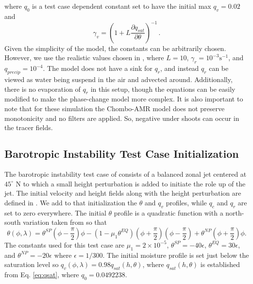    where $q_0$ is a test case dependent constant set to have the initial max $q_v=0.02$ and
   \begin{equation}
     \label{eq:gammav} \gamma_v = \left(1 + L \frac{\partial q_{sat}}{\partial \theta}\right)^{-1} \, .
   \end{equation}
Given the simplicity of the model, the constants can be arbitrarily chosen. 
However, we use the realistic values chosen in \cite{zerroukat2015moist}, 
where $L=10$, $\gamma_r = 10^{-3} \mathrm{ s}^{-1}$, and $q_{precip} = 10^{-4}$. 
The model does not have a sink for $q_r$, and instead $q_r$ can be viewed 
as water being suspend in the air and advected around. Additionally, there
is no evaporation of $q_r$ in this setup, though the equations can be 
easily modified to make the phase-change model more complex. It is also
important to note that for these simulation the Chombo-AMR model does
not preserve monotonicity and no filters are applied. So, 
negative under shoots can occur in the tracer fields.
  
\subsection{Barotropic Instability Test Case Initialization}
The barotropic instability test case of \cite{galewsky2004initial} 
consists of a balanced zonal jet centered at $45^\circ$ N to 
which a small height perturbation is added to initiate the role up
of the jet. The initial velocity and height fields along with the height
perturbation are defined in \cite{galewsky2004initial}.
We add to that initialization the
$\theta$ and $q_v$ profiles, while $q_c$ and $q_r$ are set to zero everywhere.  
The initial $\theta$ profile is a quadratic function with a north-south variation
     taken from \cite{zerroukat2015moist} so that
   \begin{equation}
     \label{eq:pottemp}
     \theta(\phi, \lambda) = \theta^{SP}\left(\phi - \frac{\pi}{2}\right)\phi - 
     \left(1 - \mu_1 \theta^{EQ}\right)\left(\phi + \frac{\pi}{2}\right)\left(\phi - \frac{\pi}{2}\right)
     + \theta^{NP}\left(\phi + \frac{\pi}{2}\right)\phi.
   \end{equation}
The constants used for this test case are $\mu_1 = 2\times 10^{-5} $, 
$\theta^{SP}= -40\epsilon$, $\theta^{EQ}= 30\epsilon$,
and $\theta^{NP}= -20\epsilon$ where $\epsilon = 1 / 300$. The initial moisture profile 
is set just below the saturation level so $q_v(\phi, \lambda) = 0.98 q_{sat}(h, \theta)$, 
where $q_{sat}(h, \theta)$ is established from Eq. \ref{eq:qsat}, where $q_0 = 0.0492238$. 

